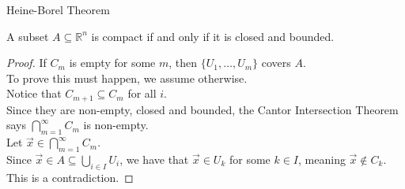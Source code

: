\documentclass{beamer}
\begin{document}
\begin{frame}{Heine-Borel Theorem}
\begin{thm}
A subset $A\subseteq\mathbb{R}^n$ is compact if and only if it is closed and bounded.
\end{thm}
\begin{proof}
If $C_m$ is empty for some $m$, then $\{U_1,\dots, U_m\}$ covers $A$.\\
To prove this must happen, we assume otherwise.\\
Notice that $C_{m+1}\subseteq C_m$ for all $i$.\\
Since they are non-empty, closed and bounded, the Cantor Intersection Theorem says $\bigcap_{m=1}^\infty C_m$ is non-empty.\\
Let $\vec x\in \bigcap_{m=1}^\infty C_m$.\\
Since $\vec x\in A\subseteq \bigcup_{i\in I} U_i$, we have that $\vec x\in U_k$ for some $k\in I$, meaning $\vec x\notin C_k$.\\
This is a contradiction.
\end{proof}
\end{frame}
\end{document}
